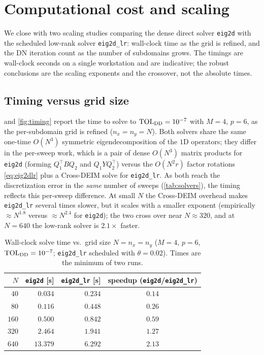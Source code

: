 \documentclass[hidelinks,onefignum,onetabnum]{siamart250211}
\newcommand{\TOL}{\mathrm{TOL}}
\begin{document}
\section{Computational cost and scaling}
\label{sec:cost}
We close with two scaling studies comparing the dense direct solver {\tt eig2d}
with the scheduled low-rank solver {\tt eig2d\_lr}: wall-clock time as the grid
is refined, and the DN iteration count as the number of subdomains grows.  The
timings are wall-clock seconds on a single workstation and are indicative; the
robust conclusions are the scaling exponents and the crossover, not the absolute
times.

\subsection{Timing versus grid size}
\label{sec:exp-timing}
 and \cref{fig:timing} report the time to solve to
$\TOL_{\rm DD}=10^{-7}$ with $M=4$, $p=6$, as the per-subdomain grid is refined
($n_x=n_y=N$).  Both solvers share the same one-time $O(N^3)$ symmetric
eigendecomposition of the $1$D operators; they differ in the per-sweep work,
which is a pair of dense $O(N^3)$ matrix products for {\tt eig2d} (forming
$Q_1^{\!\top}BQ_2$ and $Q_1YQ_2^{\!\top}$) versus the $O(N^2 r)$ factor rotations
\cref{eq:eig2dlr} plus a Cross-DEIM solve for {\tt eig2d\_lr}.  As both reach the
discretization error in the \emph{same} number of sweeps (\cref{tab:solvers}),
the timing reflects this per-sweep difference.  At small $N$ the Cross-DEIM
overhead makes {\tt eig2d\_lr} several times slower, but it scales with a smaller
exponent (empirically $\approx N^{1.8}$ versus $\approx N^{2.4}$ for
{\tt eig2d}); the two cross over near $N\approx320$, and at $N=640$ the low-rank
solver is $2.1\times$ faster.

\begin{table}[htb]
\caption{Wall-clock solve time vs.\ grid size $N=n_x=n_y$ ($M=4$, $p=6$,
$\TOL_{\rm DD}=10^{-7}$; {\tt eig2d\_lr} scheduled with $\theta=0.02$).  Times are
the minimum of two runs.\label{tab:timing}}
\begin{center}
\begin{tabular}{r r r c}
\toprule
$N$ & {\tt eig2d} [s] & {\tt eig2d\_lr} [s] & speedup ({\tt eig2d}/{\tt eig2d\_lr}) \\
\midrule
$40$  & $0.034$  & $0.234$ & $0.14$ \\
$80$  & $0.116$  & $0.448$ & $0.26$ \\
$160$ & $0.500$  & $0.842$ & $0.59$ \\
$320$ & $2.464$  & $1.941$ & $1.27$ \\
$640$ & $13.379$ & $6.292$ & $2.13$ \\
\bottomrule
\end{tabular}
\end{center}
\end{table}
\end{document}
